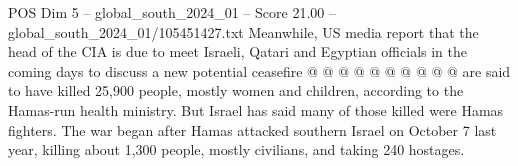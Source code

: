 \begin{textsample}{POS Dim 5 – global\_south\_2024\_01 – Score 21.00 – global\_south\_2024\_01/105451427.txt}
Meanwhile, US media report that the head of the CIA is due to meet Israeli, Qatari and Egyptian officials in the coming days to discuss a new potential ceasefire @ @ @ @ @ @ @ @ @ @ are said to have killed 25,900 people, mostly women and children, according to the Hamas-run health ministry.
But Israel has said many of those killed were Hamas fighters.
The war began after Hamas attacked southern Israel on October 7 last year, killing about 1,300 people, mostly civilians, and taking 240 hostages.

\end{textsample}
